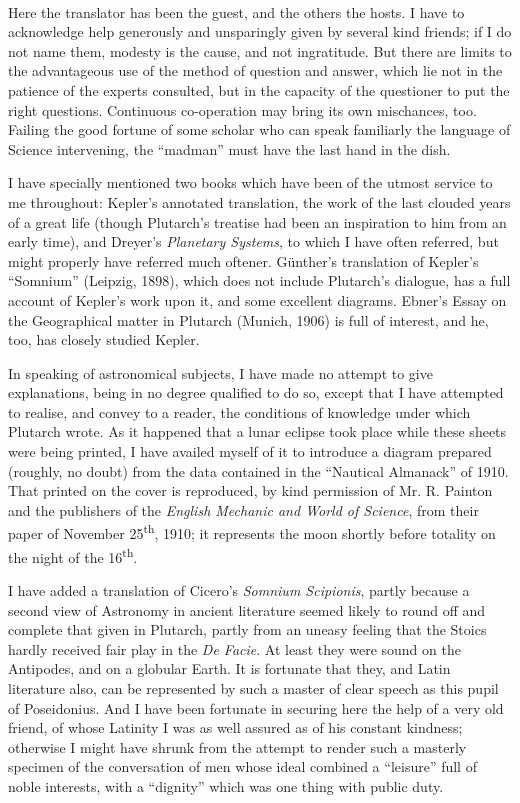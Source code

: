 \documentclass[a4paper, 11pt, oneside, polutonikogreek, english]{article}
\begin{document}
\paragraph{}
Here the translator has been the guest, and the others the hosts. I have to acknowledge help generously and unsparingly given by several kind friends; if I do not name them, modesty is the cause, and not ingratitude. But there are limits to the advantageous use of the method of question and answer, which lie not in the patience of the experts consulted, but in the capacity of the questioner to put the right questions. Continuous co-operation may bring its own mischances, too. Failing the good fortune of some scholar who can speak familiarly the language of Science intervening, the ``madman'' must have the last hand in the dish.

I have specially mentioned two books which have been of the utmost service to me throughout: Kepler's annotated translation, the work of the last clouded years of a great life (though Plutarch's treatise had been an inspiration to him from an early time), and Dreyer's \emph{Planetary Systems}, to which I have often referred, but might properly have referred much oftener. Günther's translation of Kepler's ``Somnium'' (Leipzig, 1898), which does not include Plutarch's dialogue, has a full account of Kepler's work upon it, and some excellent diagrams. Ebner's Essay on the Geographical matter in Plutarch (Munich, 1906) is full of interest, and he, too, has closely studied Kepler.

In speaking of astronomical subjects, I have made no attempt to give explanations, being in no degree qualified to do so, except that I have attempted to realise, and convey to a reader, the conditions of knowledge under which Plutarch wrote. As it happened that a lunar eclipse took place while these sheets were being printed, I have availed myself of it to introduce a diagram prepared (roughly, no doubt) from the data contained in the ``Nautical Almanack'' of 1910. That printed on the cover is reproduced, by kind permission of Mr. R. Painton and the publishers of the \emph{English Mechanic and World of Science}, from their paper of November 25\textsuperscript{th}, 1910; it represents the moon shortly before totality on the night of the 16\textsuperscript{th}.

I have added a translation of Cicero's \emph{Somnium Scipionis}, partly because a second view of Astronomy in ancient literature seemed likely to round off and complete that given in Plutarch, partly from an uneasy feeling that the Stoics hardly received fair play in the \emph{De Facie}. At least they were sound on the Antipodes, and on a globular Earth. It is fortunate that they, and Latin literature also, can be represented by such a master of clear speech as this pupil of Poseidonius. And I have been fortunate in securing here the help of a very old friend, of whose Latinity I was as well assured as of his constant kindness; otherwise I might have shrunk from the attempt to render such a masterly specimen of the conversation of men whose ideal combined a ``leisure'' full of noble interests, with a ``dignity'' which was one thing with public duty.
\end{document}
